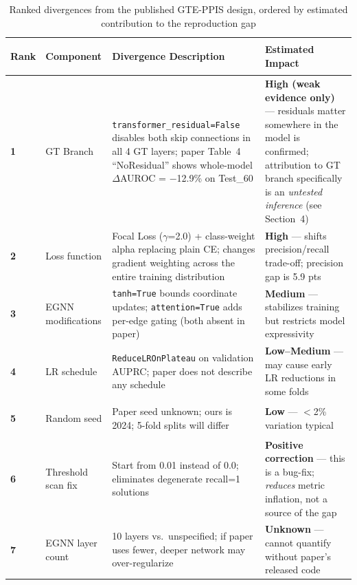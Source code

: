 \documentclass[10pt, a4paper]{article}
\newcommand{\code}[1]{\texttt{\small #1}}
\begin{document}
\begin{table}[ht]
\caption{Ranked divergences from the published GTE-PPIS design, ordered by estimated contribution to the reproduction gap}
\label{tab:divergences}
\begin{tabularx}{\linewidth}{
    >{\footnotesize\centering\arraybackslash}p{0.9cm}
    >{\footnotesize\bfseries\raggedright\arraybackslash}p{2.2cm}
    Y
    >{\footnotesize\raggedright\arraybackslash}p{3.5cm}}
\toprule
\normalsize\textbf{Rank} & \normalsize\textbf{Component} &
\normalsize\textbf{Divergence Description} & \normalsize\textbf{Estimated Impact} \\
\midrule
\textbf{1} & GT Branch &
  \code{transformer\_residual=False} disables both skip connections in all 4 GT layers;
  paper Table~4 ``NoResidual'' shows whole-model $\Delta$AUROC = $-$12.9\% on Test\_60 &
  \textbf{High (weak evidence only)} --- residuals matter somewhere in the model is confirmed;
  attribution to GT branch specifically is an \emph{untested inference} (see Section~4) \\
\addlinespace
\textbf{2} & Loss function &
  Focal Loss ($\gamma$=2.0) + class-weight alpha replacing plain CE;
  changes gradient weighting across the entire training distribution &
  \textbf{High} --- shifts precision/recall trade-off; precision gap is 5.9 pts \\
\addlinespace
\textbf{3} & EGNN modifications &
  \code{tanh=True} bounds coordinate updates; \code{attention=True} adds per-edge gating
  (both absent in paper) &
  \textbf{Medium} --- stabilizes training but restricts model expressivity \\
\addlinespace
\textbf{4} & LR schedule &
  \code{ReduceLROnPlateau} on validation AUPRC; paper does not describe any schedule &
  \textbf{Low--Medium} --- may cause early LR reductions in some folds \\
\addlinespace
\textbf{5} & Random seed &
  Paper seed unknown; ours is 2024; 5-fold splits will differ &
  \textbf{Low} --- $<$2\% variation typical \\
\addlinespace
\textbf{6} & Threshold scan fix &
  Start from 0.01 instead of 0.0; eliminates degenerate recall=1 solutions &
  \textbf{Positive correction} --- this is a bug-fix; \emph{reduces} metric inflation,
  not a source of the gap \\
\addlinespace
\textbf{7} & EGNN layer count &
  10 layers vs.\ unspecified; if paper uses fewer, deeper network may over-regularize &
  \textbf{Unknown} --- cannot quantify without paper's released code \\
\bottomrule
\end{tabularx}
\end{table}
\end{document}
